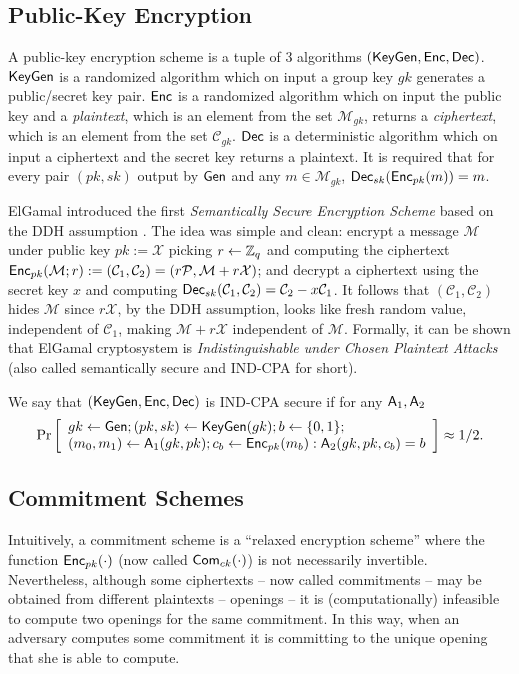 \subsection{Public-Key Encryption}

A public-key encryption scheme is a tuple of 3 algorithms $(\mathsf{KeyGen},\mathsf{Enc},\mathsf{Dec})$. $\mathsf{KeyGen}$ is a randomized algorithm which on input a group key $gk$ generates a public/secret key pair. $\mathsf{Enc}$ is a randomized algorithm which on input the public key and a \emph{plaintext}, which is an element from the set $\mathcal{M}_{gk}$, returns a \emph{ciphertext}, which is an element from the set $\mathcal{C}_{gk}$. $\mathsf{Dec}$ is a deterministic algorithm which on input a ciphertext and the secret key returns a plaintext. It is required that for every pair $(pk,sk)$ output by $\mathsf{Gen}$ and any $m\in\mathcal{M}_{gk}$, $\mathsf{Dec}_{sk}(\mathsf{Enc}_{pk}(m))=m$.

ElGamal introduced the first \emph{Semantically Secure Encryption Scheme} based on the DDH assumption \cite{ElGamal85}. The idea was simple and clean: encrypt a message $\mathcal{M}$ under public key $pk:=\mathcal{X}$ picking $r\gets\mathbb{Z}_q$ and computing the ciphertext $\mathsf{Enc}_{pk}(\mathcal{M};r):=(\mathcal{C}_1,\mathcal{C}_2)=(r\mathcal{P},\mathcal{M}+r\mathcal{X})$; and decrypt a ciphertext using the secret key $x$ and computing $\mathsf{Dec}_{sk}(\mathcal{C}_1,\mathcal{C}_2)=\mathcal{C}_2-x\mathcal{C}_1$. It follows that $(\mathcal{C}_1,\mathcal{C}_2)$ hides $\mathcal{M}$ since $r\mathcal{X}$, by the DDH assumption, looks like fresh random value, independent of $\mathcal{C}_1$, making $\mathcal{M}+r\mathcal{X}$ independent of $\mathcal{M}$. Formally, it can be shown that ElGamal cryptosystem is \emph{Indistinguishable under Chosen Plaintext Attacks} (also called semantically secure and IND-CPA for short).

\begin{definition}
We say that $(\mathsf{KeyGen},\mathsf{Enc},\mathsf{Dec})$ is IND-CPA secure if for any $\mathsf{A}_1,\mathsf{A}_2$
$$
\Pr\left[\begin{array}{l}
gk\gets\mathsf{Gen};(pk,sk)\gets\mathsf{KeyGen}(gk);b\gets\{0,1\};\\
(m_0,m_1)\gets\mathsf{A}_1(gk,pk);
c_b\gets\mathsf{Enc}_{pk}(m_b):\mathsf{A}_2(gk,pk,c_b)=b
\end{array}\right]\approx 1/2.
$$
\end{definition}

\subsection{Commitment Schemes}
Intuitively, a commitment scheme is a ``relaxed encryption scheme'' where the function $\mathsf{Enc}_{pk}(\cdot)$ (now called $\mathsf{Com}_{ck}(\cdot)$) is not necessarily invertible. Nevertheless, although some ciphertexts -- now called commitments -- may be obtained from different plaintexts -- openings -- it is (computationally) infeasible to compute two openings for the same commitment. In this way, when an adversary computes some commitment it is committing to the unique opening that she is able to compute.
 
